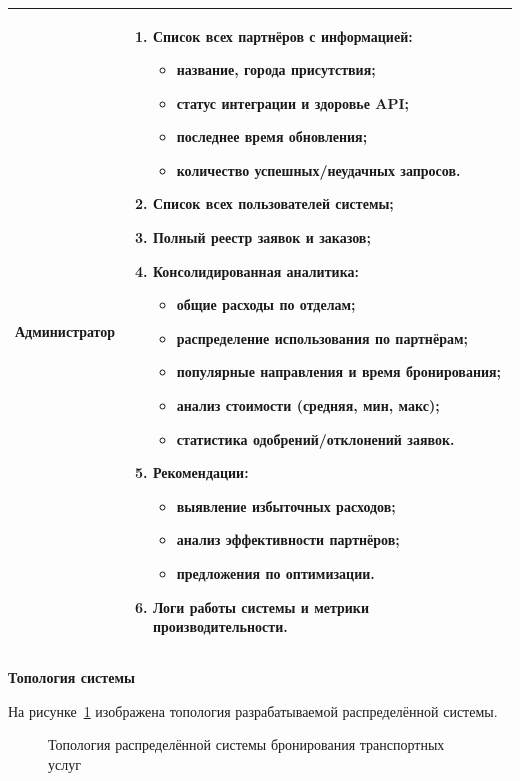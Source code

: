 \documentclass{bmstu}
\begin{document}
\begin{longtable}{|p{}|p{}|}
Администратор & 
\begin{enumerate}
    \item Список всех партнёров с информацией:
    \begin{itemize}
        \item название, города присутствия;
        \item статус интеграции и здоровье API;
        \item последнее время обновления;
        \item количество успешных/неудачных запросов.
    \end{itemize}
    \item Список всех пользователей системы;
    \item Полный реестр заявок и заказов;
    \item Консолидированная аналитика:
    \begin{itemize}
        \item общие расходы по отделам;
        \item распределение использования по партнёрам;
        \item популярные направления и время бронирования;
        \item анализ стоимости (средняя, мин, макс);
        \item статистика одобрений/отклонений заявок.
    \end{itemize}
    \item Рекомендации:
    \begin{itemize}
        \item выявление избыточных расходов;
        \item анализ эффективности партнёров;
        \item предложения по оптимизации.
    \end{itemize}
    \item Логи работы системы и метрики производительности.
\end{enumerate} \\
\hline

\end{longtable}

\begin{center}
    \textbf{Топология системы}
\end{center}

На рисунке~\ref{fig:topology} изображена топология разрабатываемой распределённой системы.

\begin{figure}[h]
    \centering
    \caption{Топология распределённой системы бронирования транспортных услуг}
    \label{fig:topology}
\end{figure}
\end{document}
